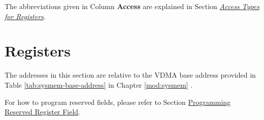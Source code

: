 \documentclass[main\_\_EN.tex]{subfiles}
\begin{document}
The abbreviations given in Column \textbf{Access} are explained in Section \hyperref[glossary-access-types]{\textit{Access Types for Registers}}.






\newpage
\section{Registers}

The addresses in this section are relative to the VDMA base address provided in Table \ref{tab:sysmem-base-address} in Chapter \ref{mod:sysmem} \textit{}.

For how to program reserved fields, please refer to Section \hyperref[programming-reserved-field]{Programming Reserved Register Field}.


\end{document}
